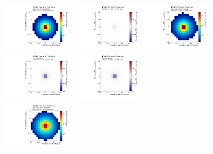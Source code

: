 \begin{figure}[h!]
\begin{center}
\includegraphics[width=0.31\textwidth]{figures/CNN/quark_truth.pdf}
\includegraphics[width=0.31\textwidth]{figures/CNN/diff_quark_truth_track.pdf}
\includegraphics[width=0.31\textwidth]{figures/CNN/quark_track.pdf}\\
\includegraphics[width=0.31\textwidth]{figures/CNN/diff_truth.pdf}\hspace{54mm}
\includegraphics[width=0.31\textwidth]{figures/CNN/diff_track.pdf}\\
\includegraphics[width=0.31\textwidth]{figures/CNN/gluon_truth.pdf}

\end{center}
\end{figure}
